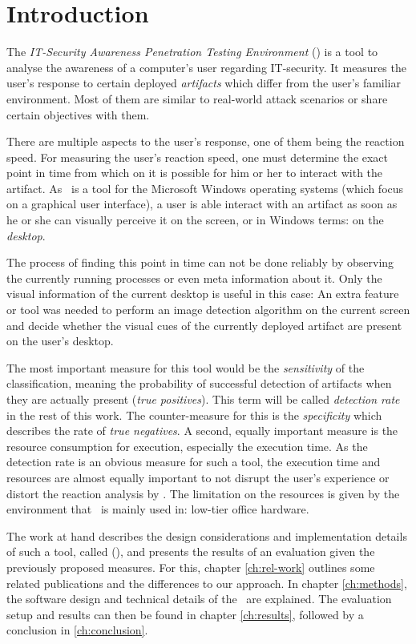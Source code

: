 \chapter{Introduction}\label{ch:intro}

The \emph{IT-Security Awareness Penetration Testing Environment} (\ape)\cite{itsape} is a tool to analyse the awareness of a computer's user regarding IT-security. It measures the user's response to certain deployed \emph{artifacts} which differ from the user's familiar environment. Most of them are similar to real-world attack scenarios or share certain objectives with them.

There are multiple aspects to the user's response, one of them being the reaction speed. For measuring the user's reaction speed, one must determine the exact point in time from which on it is possible for him or her to interact with the artifact. As \ape~is a tool for the Microsoft Windows operating systems (which focus on a graphical user interface), a user is able interact with an artifact as soon as he or she can visually perceive it on the screen, or in Windows terms: on the \emph{desktop}.

The process of finding this point in time can not be done reliably by observing the currently running processes or even meta information about it. Only the visual information of the current desktop is useful in this case: An extra feature or tool was needed to perform an image detection algorithm on the current screen and decide whether the visual cues of the currently deployed artifact are present on the user's desktop.

The most important measure for this tool would be the \emph{sensitivity} of the classification, meaning the probability of successful detection of artifacts when they are actually present (\emph{true positives}). This term will be called \emph{detection rate} in the rest of this work. The counter-measure for this is the \emph{specificity} which describes the rate of \emph{true negatives}. A second, equally important measure is the resource consumption for execution, especially the execution time. As the detection rate is an obvious measure for such a tool, the execution time and resources are almost equally important to not disrupt the user's experience or distort the reaction analysis by \ape. The limitation on the resources is given by the environment that \ape~is mainly used in: low-tier office hardware.

The work at hand describes the design considerations and implementation details of such a tool, called \emph{\vad} (\emph{\vd}), and presents the results of an evaluation given the previously proposed measures. For this, chapter \ref{ch:rel-work} outlines some related publications and the differences to our approach. In chapter \ref{ch:methods}, the software design and technical details of the \vd~are explained. The evaluation setup and results can then be found in chapter \ref{ch:results}, followed by a conclusion in \ref{ch:conclusion}.

